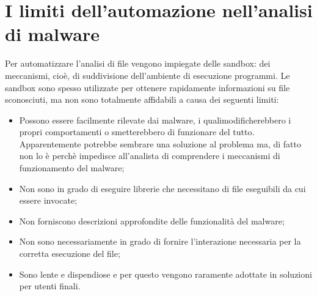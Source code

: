 \documentclass[12pt,oneside]{fithesis2}
\begin{document}
        \section*{I limiti dell'automazione nell'analisi di malware}
        Per automatizzare l'analisi di file vengono impiegate delle sandbox: dei meccanismi, cioè, di suddivisione dell'ambiente di esecuzione programmi. Le sandbox sono spesso utilizzate per ottenere rapidamente informazioni su file sconosciuti, ma non sono totalmente affidabili a causa dei seguenti limiti:
        \begin{itemize}
            \item Possono essere facilmente rilevate dai malware, i quali\newline modificherebbero i propri comportamenti o smetterebbero di funzionare del tutto. Apparentemente potrebbe sembrare una soluzione al problema ma, di fatto non lo è perchè impedisce all'analista di comprendere i meccanismi di funzionamento del malware;
            \item Non sono in grado di eseguire librerie che necessitano di file eseguibili da cui essere invocate;
            \item Non forniscono descrizioni approfondite delle funzionalità del malware;
            \item Non sono necessariamente in grado di fornire l'interazione necessaria per la corretta esecuzione del file;
            \item Sono lente e dispendiose e per questo vengono raramente adottate in soluzioni per utenti finali.
        \end{itemize}
        
\end{document}
